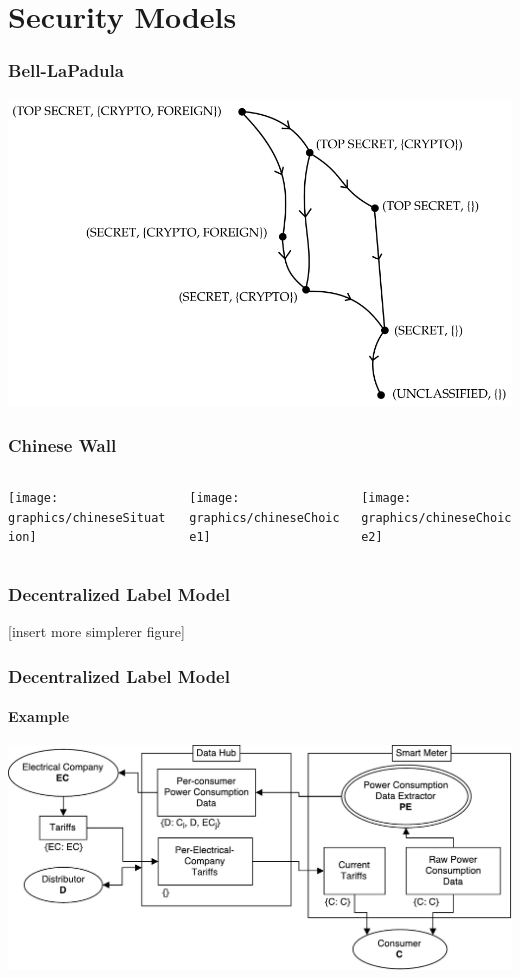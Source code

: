 
\section{Security Models}

\begin{frame}
  \frametitle{Bell-LaPadula}
  \centering

  \includegraphics[width=\textwidth]{graphics/blp_lattice}
\end{frame}

\begin{frame}
  \frametitle{Chinese Wall}

  \begin{columns}
    \begin{column}{.33\textwidth}
      \texttt{[image: graphics/chineseSituation]}
    \end{column}
    \begin{column}{.33\textwidth}
      \texttt{[image: graphics/chineseChoice1]}
    \end{column}
    \begin{column}{.33\textwidth}
      \texttt{[image: graphics/chineseChoice2]}
    \end{column}
  \end{columns}
\end{frame}

\begin{frame}
  \frametitle{Decentralized Label Model}

  [insert more simplerer figure]
\end{frame}

\begin{frame}
  \frametitle{Decentralized Label Model}
  \framesubtitle{Example}
  \centering

  \includegraphics[width=\textwidth]{graphics/dlm_sm_example}
\end{frame}
